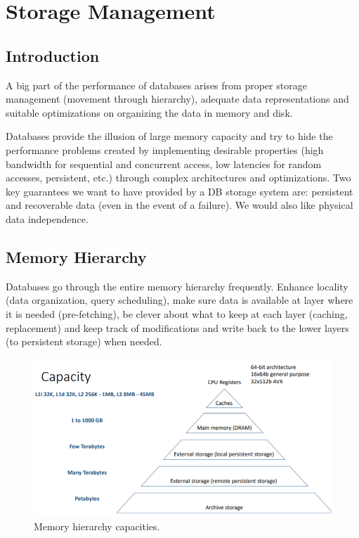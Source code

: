 \section{Storage Management}

\subsection{Introduction}

A big part of the performance of databases arises from proper storage management (movement through hierarchy), adequate data representations and suitable optimizations on organizing the data in memory and disk.

Databases provide the illusion of large memory capacity and try to hide the performance problems created by implementing desirable properties (high bandwidth for sequential and concurrent access, low latencies for random accesses, persistent, etc.) through complex architectures and optimizations. Two key guarantees we want to have provided by a DB storage system are: persistent and recoverable data (even in the event of a failure). We would also like physical data independence.



\subsection{Memory Hierarchy}

Databases go through the entire memory hierarchy frequently. Enhance locality (data organization, query scheduling), make sure data is available at layer where it is needed (pre-fetching), be clever about what to keep at each layer (caching, replacement) and keep track of modifications and write back to the lower layers (to persistent storage) when needed.

\begin{figure}[h]
	\centering
	\includegraphics[scale=0.5]{images/1-cap.PNG}
	\caption{Memory hierarchy capacities.}
	\label{fig:cap}
\end{figure}

